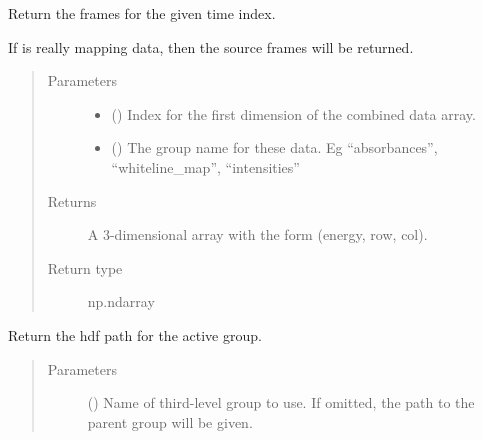 \documentclass[letterpaper,10pt,english]{sphinxmanual}
\begin{document}
\begin{fulllineitems}
\begin{fulllineitems}
\label{\detokenize{xanespy:xanespy.xanes_frameset.XanesFrameset.frames}}
Return the frames for the given time index.

If  is really mapping data, then the source
frames will be returned.
\begin{quote}\begin{description}
\item[{Parameters}] \leavevmode\begin{itemize}
\item {} 
 () \textendash{} Index for the first dimension of the combined data array.

\item {} 
 () \textendash{} The group name for these data. Eg “absorbances”,
“whiteline\_map”, “intensities”

\end{itemize}

\item[{Returns}] \leavevmode
{} \textendash{} A 3-dimensional array with the form (energy, row, col).

\item[{Return type}] \leavevmode
np.ndarray

\end{description}\end{quote}

\end{fulllineitems}


\begin{fulllineitems}
\label{\detokenize{xanespy:xanespy.xanes_frameset.XanesFrameset.has_representation}}
\end{fulllineitems}


\begin{fulllineitems}
\label{\detokenize{xanespy:xanespy.xanes_frameset.XanesFrameset.hdf_path}}
Return the hdf path for the active group.
\begin{quote}\begin{description}
\item[{Parameters}] \leavevmode
{} (\sphinxstyleliteralemphasis{, }) \textendash{} Name of third-level group to use. If omitted, the path to
the parent group will be given.


\end{description}
\end{quote}
\end{fulllineitems}
\end{fulllineitems}
\end{document}
